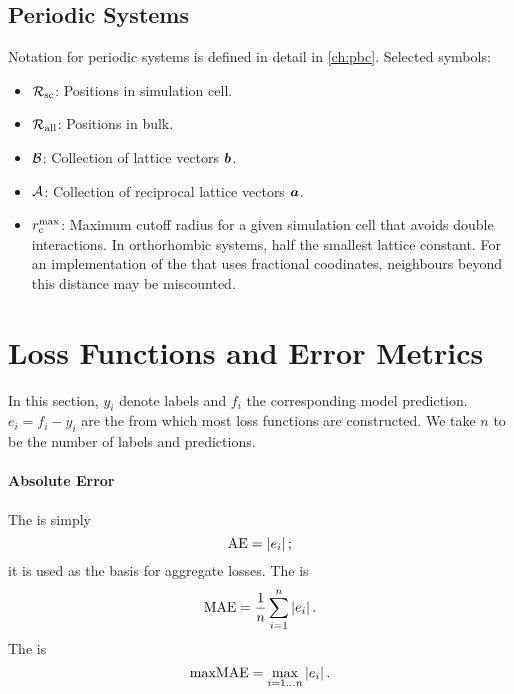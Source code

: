 \subsection{Periodic Systems}

Notation for periodic systems is defined in detail in \cref{ch:pbc}. Selected symbols:
\begin{itemize}
	\item $\mathcal{R_{\text{sc}}}$: Positions in simulation cell.
	\item $\mathcal{R_{\text{all}}}$: Positions in bulk.
	\item $\mathcal{B}$: Collection of lattice vectors $\boldsymbol{b}$.
	\item $\mathcal{A}$: Collection of reciprocal lattice vectors $\boldsymbol{a}$.
	\item $r_{\text{c}}^{\text{max}}$: Maximum cutoff radius for a given simulation cell that avoids double interactions. In orthorhombic systems, half the smallest lattice constant. For an implementation of the \mic that uses fractional coodinates, neighbours beyond this distance may be miscounted.
\end{itemize}


\section{Loss Functions and Error Metrics}
\label{sec:si-ml_lossf}

In this section, $y_i$ denote labels and $f_i$ the corresponding model prediction. $e_i{=}f_i-y_i$ are the  from which most loss functions are constructed. We take $n$ to be the number of labels and predictions.

\paragraph{Absolute Error}
The  is simply
\begin{equation}
	\text{AE} = |e_i| \,;
\end{equation}
it is used as the basis for aggregate losses.
The  is
\begin{equation}
	\text{MAE} = \frac{1}{n} \sum_{i=1}^n |e_i| \, .
\end{equation}
The  is
\begin{equation}
	\text{maxMAE} = \max_{i=1...n} |e_i| \, .
\end{equation}

